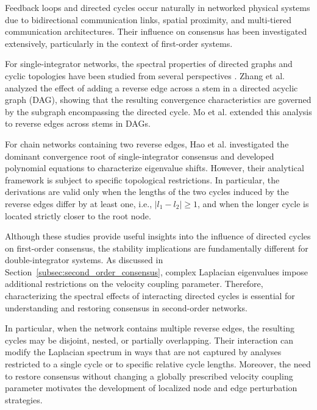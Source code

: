 Feedback loops and directed cycles occur naturally in networked physical systems due to bidirectional communication links, spatial proximity, and multi-tiered communication architectures. Their influence on consensus has been investigated extensively, particularly in the context of first-order systems.

For single-integrator networks, the spectral properties of directed graphs and cyclic topologies have been studied from several perspectives \cite{mukherjee2016consensus, mukherjee2013reachability, mukherjee2021finite}. Zhang et al. \cite{zhang2017effect} analyzed the effect of adding a reverse edge across a stem in a directed acyclic graph (DAG), showing that the resulting convergence characteristics are governed by the subgraph encompassing the directed cycle. Mo et al. \cite{mo2019effects} extended this analysis to reverse edges across stems in DAGs.

For chain networks containing two reverse edges, Hao et al. \cite{hao2019role} investigated the dominant convergence root of single-integrator consensus and developed polynomial equations to characterize eigenvalue shifts. However, their analytical framework is subject to specific topological restrictions. In particular, the derivations are valid only when the lengths of the two cycles induced by the reverse edges differ by at least one, i.e.,
$|l_1-l_2|\geq 1$, and when the longer cycle is located strictly closer to the root node.

Although these studies provide useful insights into the influence of directed cycles on first-order consensus, the stability implications are fundamentally different for double-integrator systems. As discussed in Section~\ref{subsec:second_order_consensus}, complex Laplacian eigenvalues impose additional restrictions on the velocity coupling parameter. Therefore, characterizing the spectral effects of interacting directed cycles is essential for understanding and restoring consensus in second-order networks.

In particular, when the network contains multiple reverse edges, the resulting cycles may be disjoint, nested, or partially overlapping. Their interaction can modify the Laplacian spectrum in ways that are not captured by analyses restricted to a single cycle or to specific relative cycle lengths. Moreover, the need to restore consensus without changing a globally prescribed velocity coupling parameter motivates the development of localized node and edge perturbation strategies.

